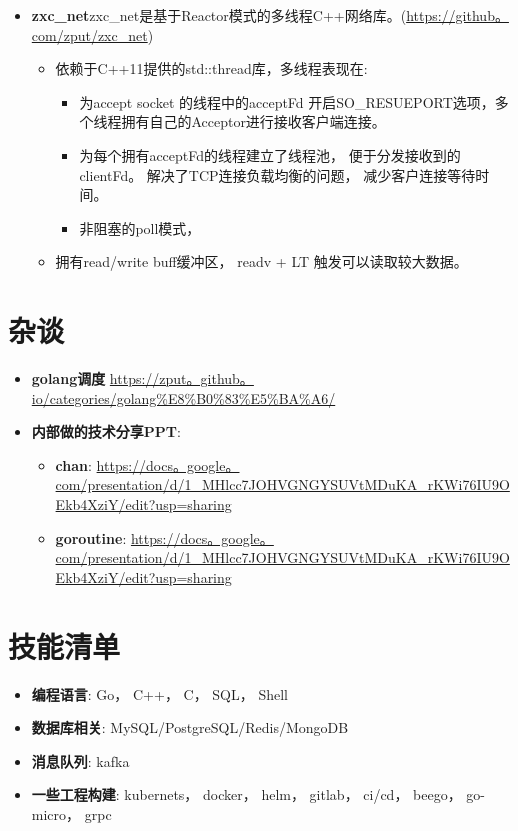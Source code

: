 \documentclass{resume}
\begin{document}
\begin{itemize}[parsep=0。2ex]
  \item \textbf{zxc\_net}zxc\_net是基于Reactor模式的多线程C++网络库。(\url{https://github。com/zput/zxc\_net})
    \begin{itemize}[parsep=0。2ex]
          \item 依赖于C++11提供的std::thread库，多线程表现在:
            \begin{itemize}[parsep=0。2ex]
              \item 为accept socket 的线程中的acceptFd 开启SO\_RESUEPORT选项，多个线程拥有自己的Acceptor进行接收客户端连接。
              \item 为每个拥有acceptFd的线程建立了线程池， 便于分发接收到的clientFd。 解决了TCP连接负载均衡的问题， 减少客户连接等待时间。
              \item 非阻塞的poll模式，
            \end{itemize}
          \item 拥有read/write buff缓冲区， readv + LT 触发可以读取较大数据。
    \end{itemize}
\end{itemize}


\section{杂谈}
\begin{itemize}[parsep=0。2ex]
  \item \textbf{golang调度} \url{https://zput。github。io/categories/golang%E8%B0%83%E5%BA%A6/}
  \item \textbf{内部做的技术分享PPT}:
  \begin{itemize}[parsep=0。2ex]
    \item \textbf{chan}: \url{https://docs。google。com/presentation/d/1_MHlcc7JOHVGNGYSUVtMDuKA_rKWi76IU9OEkb4XziY/edit?usp=sharing}
    \item \textbf{goroutine}: \url{https://docs。google。com/presentation/d/1_MHlcc7JOHVGNGYSUVtMDuKA_rKWi76IU9OEkb4XziY/edit?usp=sharing}
  \end{itemize}
\end{itemize}

\section{技能清单}
\begin{itemize}[parsep=0。2ex]
  \item \textbf{编程语言}: Go， C++， C， SQL， Shell
  \item \textbf{数据库相关}: MySQL/PostgreSQL/Redis/MongoDB
  \item \textbf{消息队列}: kafka
  \item \textbf{一些工程构建}: kubernets， docker， helm， gitlab， ci/cd， beego， go-micro， grpc
\end{itemize}


%
%
\end{document}
